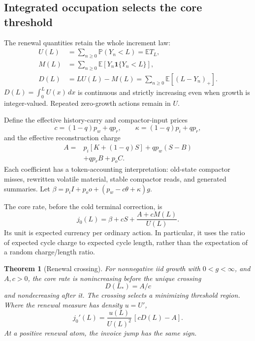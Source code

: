 \documentclass[sigconf,screen,nonacm]{acmart}
\newcommand{\E}{\mathbb{E}}
\newcommand{\Prob}{\mathbb{P}}
\newcommand{\ind}{\mathbf{1}}
\newcommand{\Core}{j_0}
\newtheorem{result}{Theorem}[section]
\begin{document}
\subsection{Integrated occupation selects the core threshold}
\label{sec:renewal}

The renewal quantities retain the whole increment law:
\begin{align}
U(L)&=\sum_{n\ge0}\Prob(Y_n<L)=\E T_L,\label{eq:U}\\
M(L)&=\sum_{n\ge0}\E[Y_n\ind\{Y_n<L\}],\label{eq:M}\\
D(L)&=LU(L)-M(L)=\sum_{n\ge0}\E[(L-Y_n)_+].\label{eq:D}
\end{align}
$D(L)=\int_0^LU(x)\,dx$ is continuous and strictly increasing even when
growth is integer-valued. Repeated zero-growth actions remain in $U$.

Define the effective history-carry and compactor-input prices
\begin{equation}
c=(1-q)p_w+qp_r,\qquad\kappa=(1-q)p_i+qp_r,
\label{eq:carry}
\end{equation}
and the effective reconstruction charge
\begin{equation}
\begin{split}
A={}&p_i[K+(1-q)S]+qp_w(S-B)\\
   &+qp_rB+p_oC.
\end{split}
\label{eq:A}
\end{equation}
Each coefficient has a token-accounting interpretation: old-state compactor
misses, rewritten volatile material, stable compactor reads, and generated
summaries. Let $\beta=p_iI+p_oo+(p_w-c\theta+\kappa)g$.

The core rate, before the cold terminal correction, is
\begin{equation}
\Core(L)=\beta+cS+\frac{A+cM(L)}{U(L)}.
\label{eq:core}
\end{equation}
Its unit is expected currency per ordinary action. In particular, it uses the
ratio of expected cycle charge to expected cycle length, rather than the
expectation of a random charge/length ratio.

\begin{result}[Renewal crossing]
\label{thm:crossing}
For nonnegative iid growth with $0<g<\infty$, and $A,c>0$, the core rate is
nonincreasing before the unique crossing
\begin{equation}
\boxed{D(L_*)=A/c}
\label{eq:root}
\end{equation}
and nondecreasing after it. The crossing selects a minimizing threshold
region. Where the renewal measure has density $u=U'$,
\begin{equation}
\Core'(L)=\frac{u(L)}{U(L)^2}\,[cD(L)-A].
\label{eq:derivative}
\end{equation}
At a positive renewal atom, the invoice jump has the same sign.
\end{result}
\end{document}
